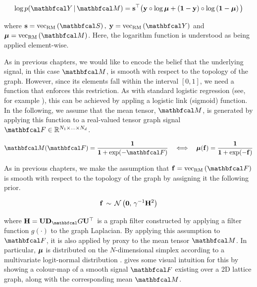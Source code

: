 \begin{equation}
   \log p(\Yt \, | \, \Mt) = \s^\top \big(\y \circ \log \muu + \left(\one  - \y\right) \circ \log \left(\one - \muu \right)\big)
\end{equation}

where $\s = \vecrm{\St}, \; \y = \vecrm{\Yt}$ and $\muu = \vecrm{\Mt}$. Here, the logarithm function is understood as being applied element-wise.

As in previous chapters, we would like to encode the belief that the underlying signal, in this case $\Mt$, is smooth with respect to the topology of the graph. However, since its elements fall within the interval $[0, 1]$, we need a function that enforces this restriction. As with standard logistic regression (see, for example \cite{Murphy2012}), this can be achieved by appling a logistic link (sigmoid) function. In the following, we assume that the mean tensor, $\Mt$, is generated by applying this function to a real-valued tensor graph signal $\Ft \in \R^{N_1 \times ... \times N_d}$. 

\begin{equation}
    \label{eq:logistic_link}
    \Mt(\Ft) = \frac{\one}{\one + \exp(-\Ft)} \quad \Longleftrightarrow \quad \muu(\f) = \frac{\one}{\one + \exp(-\f)}
\end{equation}

As in previous chapters, we make the assumption that $\f = \vecrm{\Ft}$ is smooth with respect to the topology of the graph by assigning it the following prior. 

\begin{equation}
    \mathbf{f}  \, \sim \, \mathcal{N}\left( \mathbf{0}, \, \gamma^{-1} \mathbf{H}^2 \right) 
\end{equation}

where $\HH = \U \D_\Gt \U^\top$ is a graph filter constructed by applying a filter function $g(\cdot)$ to the graph Laplacian. By applying this assumption to $\Ft$, it is also applied by proxy to the mean tensor $\Mt$. In particular, $\boldsymbol{\mu}$ is distributed on the $N$-dimensional simplex according to a multivariate logit-normal distribution \citep{Atchinson1980}.  gives some visual intuition for this by showing a colour-map of a smooth signal $\Ft$ existing over a 2D lattice graph, along with the corresponding mean $\Mt$. 

